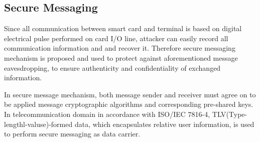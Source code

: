 \subsection{Secure Messaging}
Since all communication between smart card and terminal is based on digital electrical pulse performed on card I/O line, attacker can easily record all communication information and and recover it. Therefore secure messaging mechanism is proposed and used to protect against aforementioned message eavesdropping, to ensure authenticity and confidentiality of exchanged information.

In secure message mechanism, both message sender and receiver must agree on to be applied message cryptographic algorithms and corresponding pre-shared keys. In telecommunication domain in accordance with ISO/IEC 7816-4\cite{handbuch}, TLV(Type-lengthl-valuse)-formed data, which encapsulates relative user information, is used to perform secure messaging as data carrier.


